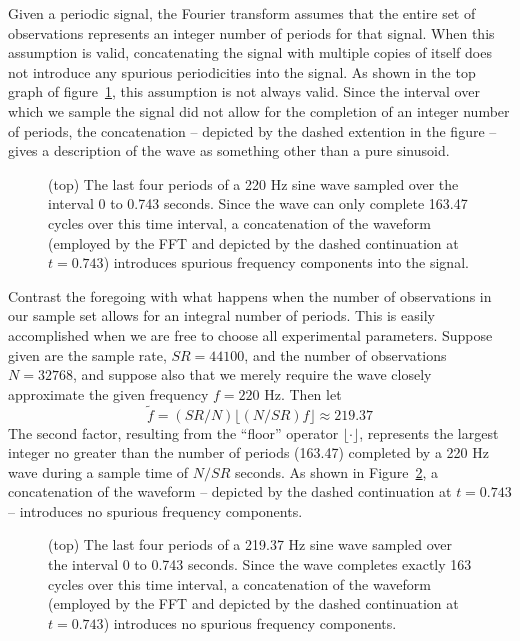 Given a periodic signal, the Fourier transform assumes that the entire
set of observations represents an integer number of periods for that
signal.  When this assumption is valid, concatenating the signal with
multiple copies of itself does not introduce any spurious
periodicities into the signal.  As shown in the top graph of 
figure~\ref{fig:FTaperiodic}, this assumption is not always valid.
Since the interval over which we sample the signal did not allow for
the completion of an integer number of periods, the concatenation --
depicted by the dashed extention in the figure -- gives a description
of the wave as something other than a pure sinusoid.
\begin{figure}
\caption{{\small (top) The last four periods of a 220 Hz sine wave sampled
over the interval 0 to 0.743 seconds.  Since the wave can only
complete 163.47 cycles over this time interval, a concatenation of the
waveform (employed by the FFT and depicted by the dashed continuation
at $t=0.743$) introduces spurious frequency components into the signal.}}
\label{fig:FTaperiodic}
\end{figure}

Contrast the foregoing with what happens when the number of
observations in our sample set allows for an integral number
of periods.  This is easily accomplished when we are free to choose
all experimental parameters.  Suppose given are the sample rate, $SR =
44100$, and the number of observations $N=32768$, and suppose also that
we merely require the wave closely approximate the given frequency 
$f = 220$ Hz.  Then let   
\[
\tilde{f} = (SR/N)\lfloor (N/SR)f\rfloor \approx 219.37
\] 
The second factor, resulting from the ``floor'' operator $\lfloor \cdot
\rfloor$, represents the largest integer no greater than the number of
periods (163.47) completed by a 220 Hz wave during a sample time of
$N/SR$ seconds. 
As shown in Figure~\ref{fig:FTperiodic}, a concatenation of the
waveform -- depicted by the dashed continuation
at $t=0.743$ -- introduces no spurious frequency components.
\begin{figure}
\caption{{\small (top) The last four periods of a 219.37 Hz sine wave sampled
over the interval 0 to 0.743 seconds.  Since the wave completes
exactly 163 cycles over this time interval, a concatenation of the
waveform (employed by the FFT and depicted by the dashed continuation
at $t=0.743$) introduces no spurious frequency components.}}
\label{fig:FTperiodic}
\end{figure}

